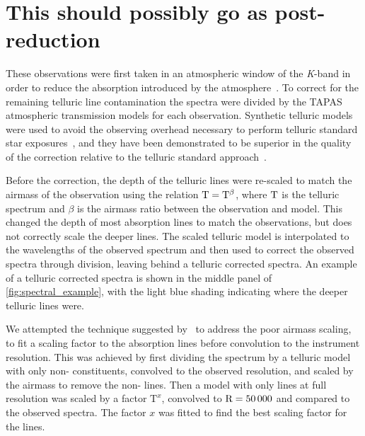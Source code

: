 \section{This should possibly go as post-reduction}
These observations were first taken in an atmospheric window of the \emph{K}-band in order to reduce the absorption introduced by the atmosphere~\citep{barnes_hd_2008}.
 To correct for the remaining telluric line contamination the spectra were divided by the {TAPAS}\citep{bertaux_tapas_2014} atmospheric transmission models for each observation.
Synthetic telluric models were used to avoid the observing overhead necessary to perform telluric standard star exposures~\citep{vacca_method_2003}, and they have been demonstrated to be superior in the quality of the correction relative to the telluric standard approach~\citep[e.g.][]{cotton_atmospheric_2014}.

Before the correction, the depth of the telluric lines were re-scaled to match the airmass of the observation using the relation \(\rm T = T^{\beta}\), where \(\rm T\) is the telluric spectrum and \(\beta\) is the airmass ratio between the observation and model.
This changed the depth of most absorption lines to match the observations, but does not correctly scale the deeper  lines.
The scaled telluric model is interpolated to the wavelengths of the observed spectrum and then used to correct the observed spectra through division, leaving behind a telluric corrected spectra.
An example of a telluric corrected spectra is shown in the middle panel of \cref{fig:spectral_example}, with the light blue shading indicating where the deeper telluric lines were.

We attempted the technique suggested by~\citet{bertaux_tapas_2014} to address the poor  airmass scaling, to fit a scaling factor to the   absorption lines before convolution to the instrument resolution.
This was achieved by first dividing the spectrum by a telluric model with only non- constituents, convolved to the observed resolution, and scaled by the airmass to remove the non- lines.
Then a model with only  lines at full resolution was scaled by a factor \(\textrm{T}^{x}\), convolved to \(\rm R=50\,000\) and compared to the observed spectra.
The factor \(x\) was fitted to find the best scaling factor for the  lines.

